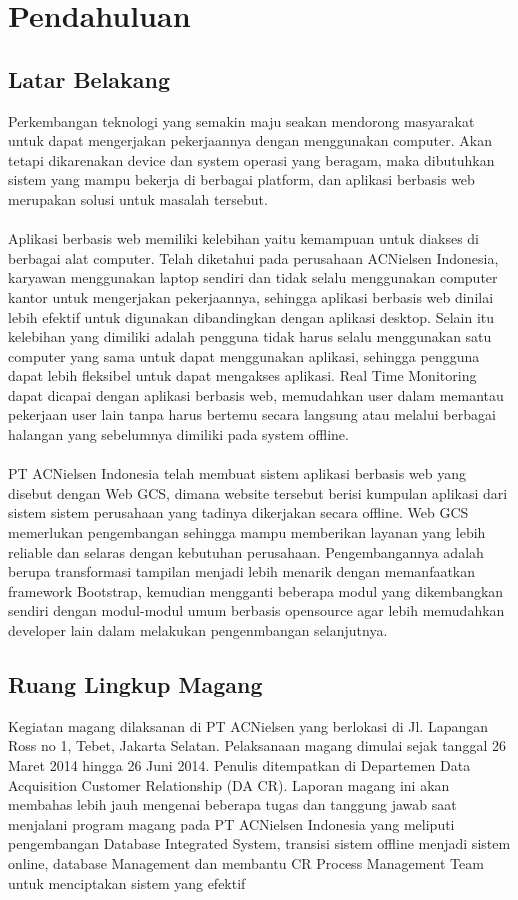 \chapter{Pendahuluan}
\section{Latar Belakang}
Perkembangan teknologi yang semakin maju seakan mendorong masyarakat untuk dapat mengerjakan pekerjaannya dengan menggunakan computer. Akan tetapi dikarenakan device dan system operasi yang beragam, maka dibutuhkan sistem yang mampu bekerja di berbagai platform, dan aplikasi berbasis web merupakan solusi untuk masalah tersebut.\\
\\
Aplikasi berbasis web memiliki kelebihan yaitu kemampuan untuk diakses di berbagai alat computer. Telah diketahui pada perusahaan ACNielsen Indonesia, karyawan menggunakan laptop sendiri dan tidak selalu menggunakan computer kantor untuk mengerjakan pekerjaannya, sehingga aplikasi berbasis web dinilai lebih efektif untuk digunakan dibandingkan dengan aplikasi desktop. Selain itu kelebihan yang dimiliki adalah pengguna tidak harus selalu menggunakan satu computer yang sama untuk dapat menggunakan aplikasi, sehingga pengguna dapat lebih fleksibel untuk dapat mengakses aplikasi. Real Time Monitoring dapat dicapai dengan aplikasi berbasis web, memudahkan user dalam memantau pekerjaan user lain tanpa harus bertemu secara langsung atau melalui berbagai halangan yang sebelumnya dimiliki pada system offline.\\
\\
PT ACNielsen Indonesia telah membuat sistem aplikasi berbasis web yang disebut dengan Web GCS, dimana website tersebut berisi kumpulan aplikasi dari sistem sistem perusahaan yang tadinya dikerjakan secara offline. Web GCS memerlukan pengembangan sehingga mampu memberikan layanan yang lebih reliable dan selaras dengan kebutuhan perusahaan. Pengembangannya adalah berupa transformasi tampilan menjadi lebih menarik dengan memanfaatkan framework Bootstrap, kemudian mengganti beberapa modul yang dikembangkan sendiri dengan modul-modul umum berbasis opensource agar lebih memudahkan developer lain dalam melakukan pengenmbangan selanjutnya.

\section{Ruang Lingkup Magang}
Kegiatan magang dilaksanan di PT ACNielsen yang berlokasi di Jl. Lapangan Ross no 1, Tebet, Jakarta Selatan. Pelaksanaan magang dimulai sejak tanggal 26 Maret 2014 hingga 26 Juni 2014. Penulis ditempatkan di Departemen Data Acquisition Customer Relationship (DA CR). Laporan magang ini akan membahas lebih jauh mengenai beberapa tugas dan tanggung jawab saat menjalani program magang pada PT ACNielsen Indonesia yang meliputi pengembangan Database Integrated System, transisi sistem offline menjadi sistem online, database Management dan membantu CR Process Management Team untuk menciptakan sistem yang efektif

